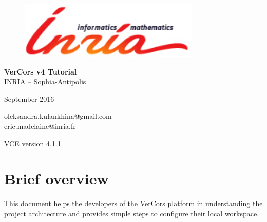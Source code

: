 \documentclass[12pt]{article}
\begin{document}
\begin{titlepage}

\begin{figure}[t]
    \centering
    \includegraphics[scale=0.4]{./draws/inria-logo.png}
\end{figure}

\vspace*{2cm}
\begin{center}
	{\huge \textbf{VerCors v4 Tutorial}} \vspace*{1cm}
\\
    {\large INRIA – Sophia-Antipolis } \medskip \\
\end{center}

%
\vfill
\begin{center}
\begin{minipage}[b]{0.5\textwidth}
    \vspace*{1.3cm}
    \begin{center}
        {\large September 2016}
    \end{center}
        \begin{center}
        {\large oleksandra.kulankhina@gmail.com \\
        \large eric.madelaine@inria.fr}
    \end{center}
     \vspace*{1cm}
        \begin{center}
        {\large VCE version 4.1.1}
    \end{center}
\end{minipage}%
\end{center}

\thispagestyle{empty}

\end{titlepage}

\tableofcontents
\newpage

\section{Brief overview}\label{sec:intro}
This document helps the developers of the VerCors platform in understanding the project architecture and provides simple steps to configure their local workspace. 
\end{document}
